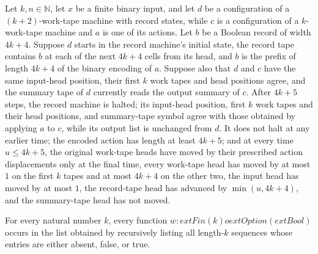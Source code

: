 \begin{lemma}
\label{Turing.StepBlock.recordTM_effect}
\leanok
{}
Let $k,n\in\mathbb N$, let $x$ be a finite binary input, and let $d$ be a configuration
of a $(k+2)$-work-tape machine with record states, while $c$ is a configuration of a
$k$-work-tape machine and $a$ is one of its actions. Let $b$ be a Boolean record of
width $4k+4$. Suppose $d$ starts in the record machine's initial state, the record tape
contains $b$ at each of the next $4k+4$ cells from its head, and $b$ is the prefix of
length $4k+4$ of the binary encoding of $a$. Suppose also that $d$ and $c$ have the same
input-head position, their first $k$ work tapes and head positions agree, and the
summary tape of $d$ currently reads the output summary of $c$. After $4k+5$ steps, the
record machine is halted; its input-head position, first $k$ work tapes and their head
positions, and summary-tape symbol agree with those obtained by applying $a$ to $c$,
while its output list is unchanged from $d$. It does not halt at any earlier time; the
encoded action has length at least $4k+5$; and at every time $u\le 4k+5$, the original
work-tape heads have moved by their prescribed action displacements only at the final
time, every work-tape head has moved by at most $1$ on the first $k$ tapes and at most
$4k+4$ on the other two, the input head has moved by at most $1$, the record-tape head
has advanced by $\min(u,4k+4)$, and the summary-tape head has not moved.
\end{lemma}

\begin{lemma}
\label{Turing.StepBlock.mem_workReadsK}
\leanok
{}
For every natural number $k$, every function $w : 	ext{Fin}(k) 	o
ext{Option}(	ext{Bool})$ occurs in the list obtained by recursively listing all
length-$k$ sequences whose entries are either absent, false, or true.
\end{lemma}

